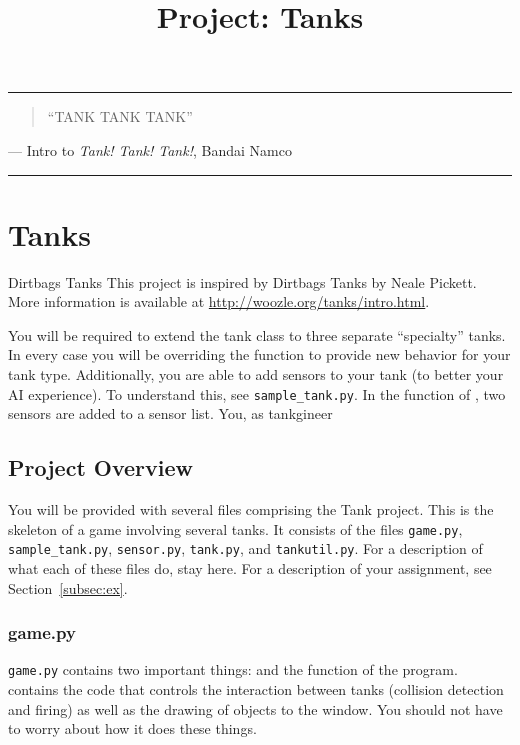 \documentclass[11pt]{cselabheader}
\title{Project: Tanks}
\begin{document}
\maketitle

\hrule

\begin{quotation}
  ``TANK TANK TANK''
\end{quotation}
\begin{flushright}
  --- Intro to \emph{Tank! Tank! Tank!}, Bandai Namco
\end{flushright}

\hrule


\section{Tanks}

\begin{warningbox}{Dirtbags Tanks}
  This project is inspired by Dirtbags Tanks by Neale Pickett.
  More information is available at \url{http://woozle.org/tanks/intro.html}.
\end{warningbox}

You will be required to extend the tank class to three separate
``specialty'' tanks. In every case you will be overriding the
 function to provide new behavior for your tank
type. Additionally, you are able to add sensors to your tank (to
better your AI experience). To understand this, see
\texttt{sample\_tank.py}. In the  function of
, two sensors are added to a sensor list. You, as
tankgineer


\subsection{Project Overview}
You will be provided with several files comprising the Tank project. This is the
skeleton of a game involving several tanks. It consists of the files
\texttt{game.py}, \texttt{sample\_tank.py}, \texttt{sensor.py},
\texttt{tank.py}, and \texttt{tankutil.py}. For a description of what each of
these files do, stay here. For a description of your assignment, see
Section~\ref{subsec:ex}.

\subsubsection{game.py}
\texttt{game.py} contains two important things:  and
the  function of the program. 
contains the code that controls the interaction between tanks (collision
detection and firing) as well as the drawing of objects to the
 window. You should not have to worry about how it does
these things.
\end{document}
